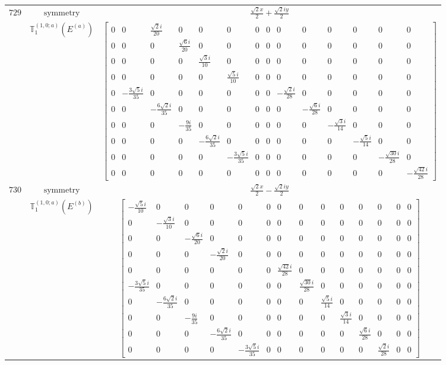 \documentclass[fleqn,8pt,landscape]{jsarticle}
\begin{document}
\begin{longtable}{ccc}
$ 729 $ & $ \text{symmetry} $ & $ \frac{\sqrt{2} x}{2} + \frac{\sqrt{2} i y}{2} $ \\
$  $ & $ \mathbb{T}_{1}^{(1,0;a)}(E^{(a)}) $ & $ \begin{bmatrix} 0 & 0 & \frac{\sqrt{2} i}{20} & 0 & 0 & 0 & 0 & 0 & 0 & 0 & 0 & 0 & 0 & 0 \\ 0 & 0 & 0 & \frac{\sqrt{6} i}{20} & 0 & 0 & 0 & 0 & 0 & 0 & 0 & 0 & 0 & 0 \\ 0 & 0 & 0 & 0 & \frac{\sqrt{3} i}{10} & 0 & 0 & 0 & 0 & 0 & 0 & 0 & 0 & 0 \\ 0 & 0 & 0 & 0 & 0 & \frac{\sqrt{5} i}{10} & 0 & 0 & 0 & 0 & 0 & 0 & 0 & 0 \\ 0 & - \frac{3 \sqrt{5} i}{35} & 0 & 0 & 0 & 0 & 0 & 0 & - \frac{\sqrt{2} i}{28} & 0 & 0 & 0 & 0 & 0 \\ 0 & 0 & - \frac{6 \sqrt{2} i}{35} & 0 & 0 & 0 & 0 & 0 & 0 & - \frac{\sqrt{6} i}{28} & 0 & 0 & 0 & 0 \\ 0 & 0 & 0 & - \frac{9 i}{35} & 0 & 0 & 0 & 0 & 0 & 0 & - \frac{\sqrt{3} i}{14} & 0 & 0 & 0 \\ 0 & 0 & 0 & 0 & - \frac{6 \sqrt{2} i}{35} & 0 & 0 & 0 & 0 & 0 & 0 & - \frac{\sqrt{5} i}{14} & 0 & 0 \\ 0 & 0 & 0 & 0 & 0 & - \frac{3 \sqrt{5} i}{35} & 0 & 0 & 0 & 0 & 0 & 0 & - \frac{\sqrt{30} i}{28} & 0 \\ 0 & 0 & 0 & 0 & 0 & 0 & 0 & 0 & 0 & 0 & 0 & 0 & 0 & - \frac{\sqrt{42} i}{28} \end{bmatrix} $ \\ \hline
$ 730 $ & $ \text{symmetry} $ & $ \frac{\sqrt{2} x}{2} - \frac{\sqrt{2} i y}{2} $ \\
$  $ & $ \mathbb{T}_{1}^{(1,0;a)}(E^{(b)}) $ & $ \begin{bmatrix} - \frac{\sqrt{5} i}{10} & 0 & 0 & 0 & 0 & 0 & 0 & 0 & 0 & 0 & 0 & 0 & 0 & 0 \\ 0 & - \frac{\sqrt{3} i}{10} & 0 & 0 & 0 & 0 & 0 & 0 & 0 & 0 & 0 & 0 & 0 & 0 \\ 0 & 0 & - \frac{\sqrt{6} i}{20} & 0 & 0 & 0 & 0 & 0 & 0 & 0 & 0 & 0 & 0 & 0 \\ 0 & 0 & 0 & - \frac{\sqrt{2} i}{20} & 0 & 0 & 0 & 0 & 0 & 0 & 0 & 0 & 0 & 0 \\ 0 & 0 & 0 & 0 & 0 & 0 & \frac{\sqrt{42} i}{28} & 0 & 0 & 0 & 0 & 0 & 0 & 0 \\ - \frac{3 \sqrt{5} i}{35} & 0 & 0 & 0 & 0 & 0 & 0 & \frac{\sqrt{30} i}{28} & 0 & 0 & 0 & 0 & 0 & 0 \\ 0 & - \frac{6 \sqrt{2} i}{35} & 0 & 0 & 0 & 0 & 0 & 0 & \frac{\sqrt{5} i}{14} & 0 & 0 & 0 & 0 & 0 \\ 0 & 0 & - \frac{9 i}{35} & 0 & 0 & 0 & 0 & 0 & 0 & \frac{\sqrt{3} i}{14} & 0 & 0 & 0 & 0 \\ 0 & 0 & 0 & - \frac{6 \sqrt{2} i}{35} & 0 & 0 & 0 & 0 & 0 & 0 & \frac{\sqrt{6} i}{28} & 0 & 0 & 0 \\ 0 & 0 & 0 & 0 & - \frac{3 \sqrt{5} i}{35} & 0 & 0 & 0 & 0 & 0 & 0 & \frac{\sqrt{2} i}{28} & 0 & 0 \end{bmatrix} $ \\ \hline

\end{longtable}
\end{document}
